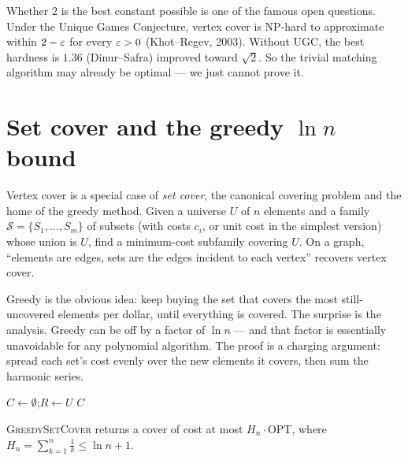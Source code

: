 \begin{historybox}
Whether $2$ is the best constant possible is one of the famous open questions. Under the Unique Games
Conjecture, vertex cover is \textsf{NP}-hard to approximate within $2-\varepsilon$ for every $\varepsilon>0$
(Khot--Regev, 2003). Without UGC, the best hardness is $1.36$ (Dinur--Safra) improved toward
$\sqrt 2$. So the trivial matching algorithm may already be optimal --- we just cannot prove it.
\end{historybox}

\section{Set cover and the greedy $\ln n$ bound}

Vertex cover is a special case of \emph{set cover}, the canonical covering problem and the home of
the greedy method. Given a universe $U$ of $n$ elements and a family
$\mathcal{S}=\{S_1,\dots,S_m\}$ of subsets (with costs $c_i$, or unit cost in the simplest version)
whose union is $U$, find a minimum-cost subfamily covering $U$. On a graph, ``elements are edges,
sets are the edges incident to each vertex'' recovers vertex cover.

\begin{intuitionbox}
Greedy is the obvious idea: keep buying the set that covers the most still-uncovered elements per
dollar, until everything is covered. The surprise is the analysis. Greedy can be off by a factor of
$\ln n$ --- and that factor is essentially unavoidable for any polynomial algorithm. The proof is a
charging argument: spread each set's cost evenly over the new elements it covers, then sum the
harmonic series.
\end{intuitionbox}

\begin{algorithm}[H]
\caption{\textsc{GreedySetCover}$(U,\mathcal{S},c)$}\label{ch38:alg-setcover}
\DontPrintSemicolon
$C \gets \emptyset$;\quad $R \gets U$ 
\Return $C$\;
\end{algorithm}

\begin{theorem}\label{ch38:thm-greedy-setcover}
\textsc{GreedySetCover} returns a cover of cost at most $H_n\cdot\mathrm{OPT}$, where
$H_n=\sum_{k=1}^n \tfrac1k \le \ln n + 1$.
\end{theorem}


